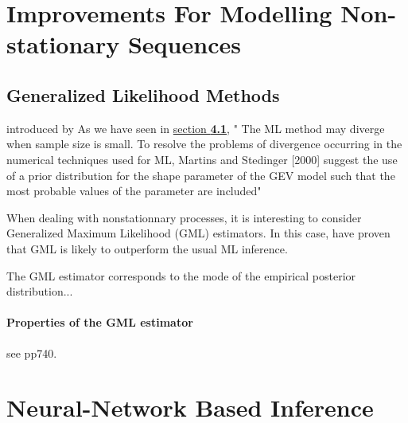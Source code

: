 
\section{Improvements For Modelling Non-stationary Sequences}\label{improvinf}
\subsection{Generalized Likelihood Methods}
introduced by \citet{martin_generalized_2000}
As we have seen in \hyperref[likintro]{section \textbf{4.1}}, 
" The ML method may diverge
when sample size is small. To resolve the problems of
divergence occurring in the numerical techniques used for
ML, Martins and Stedinger [2000] suggest the use of a prior
distribution for the shape parameter of the GEV model such
that the most probable values of the parameter are included"

When dealing with nonstationnary processes, it is interesting to consider Generalized Maximum Likelihood (GML) estimators. In this case, \cite{Adlouni_generalized_2007} have proven that GML is likely to outperform the usual ML inference.

The GML estimator corresponds to the mode of the empirical posterior distribution...

\paragraph*{Properties of the GML estimator} see pp740. \citet{martin_generalized_2000}

\section{Neural-Network Based Inference}

